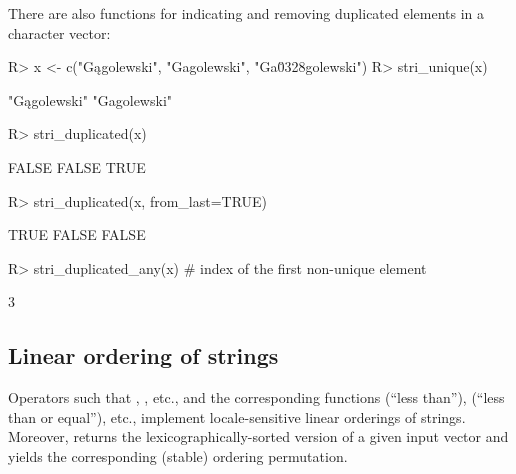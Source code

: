 \documentclass[nojss]{jss}\usepackage[]{graphicx}\usepackage[]{color}
\begin{document}
There are also functions for indicating and removing
duplicated elements in a character vector:

\begin{Schunk}
\begin{Sinput}
R> x <- c("Gągolewski", "Gagolewski", "Ga\u0328golewski")
R> stri_unique(x)
\end{Sinput}
\begin{Soutput}
[1] "Gągolewski" "Gagolewski"
\end{Soutput}
\begin{Sinput}
R> stri_duplicated(x)
\end{Sinput}
\begin{Soutput}
[1] FALSE FALSE  TRUE
\end{Soutput}
\begin{Sinput}
R> stri_duplicated(x, from_last=TRUE)
\end{Sinput}
\begin{Soutput}
[1]  TRUE FALSE FALSE
\end{Soutput}
\begin{Sinput}
R> stri_duplicated_any(x)  # index of the first non-unique element
\end{Sinput}
\begin{Soutput}
[1] 3
\end{Soutput}
\end{Schunk}







\subsection{Linear ordering of strings}



Operators such that , \code{\%<=\%}, etc.,
and the corresponding functions
 (``less than''),
 (``less than or equal''), etc.,
implement locale-sensitive linear orderings of strings.
Moreover,  returns the lexicographically-sorted
version of a given input vector and  yields
the corresponding
(stable) ordering permutation.


\end{document}
